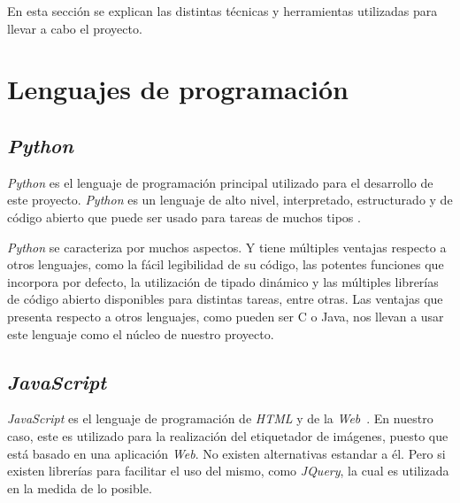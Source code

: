 

En esta sección se explican las distintas técnicas y herramientas utilizadas para llevar a cabo el proyecto.

\section{Lenguajes de programación}

\subsection{\textit{Python}}
\textit{Python} es el lenguaje de programación principal utilizado para el desarrollo de este proyecto. \textit{Python} es un lenguaje de alto nivel, interpretado, estructurado y de código abierto que puede ser usado para tareas de muchos tipos \cite{wiki:python}.

\textit{Python} se caracteriza por muchos aspectos. Y tiene múltiples ventajas respecto a otros lenguajes, como la fácil legibilidad de su código, las potentes funciones que incorpora por defecto, la utilización de tipado dinámico y las múltiples librerías de código abierto disponibles para distintas tareas, entre otras. Las ventajas que presenta respecto a otros lenguajes, como pueden ser C o Java, nos llevan a usar este lenguaje como el núcleo de nuestro proyecto.

\subsection{\textit{JavaScript}}
\textit{JavaScript} es el lenguaje de programación de \textit{HTML} y de la \textit{Web}~\cite{w3schools:javascript}. En nuestro caso, este es utilizado para la realización del etiquetador de imágenes, puesto que está basado en una aplicación \textit{Web}. No existen alternativas estandar a él. Pero si existen librerías para facilitar el uso del mismo, como \textit{JQuery}, la cual es utilizada en la medida de lo posible.

